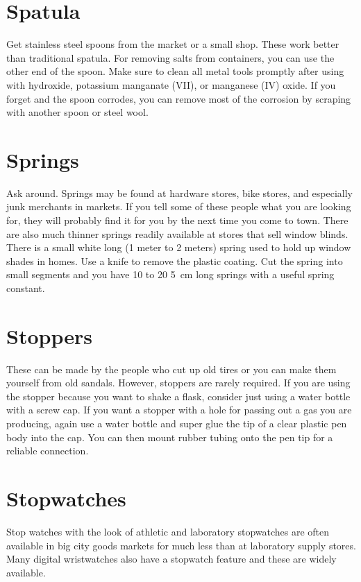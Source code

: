 \section{Spatula}
\label{sec:spatula}
Get stainless steel spoons from the market or a small shop. 
These work better than traditional spatula. 
For removing salts from containers, 
you can use the other end of the spoon. 
Make sure to clean all metal tools promptly after using with hydroxide, 
potassium manganate (VII), 
or manganese (IV) oxide. 
If you forget and the spoon corrodes, 
you can remove most of the corrosion 
by scraping with another spoon or steel wool.

\section{Springs}
\label{sec:springs}
Ask around. 
Springs may be found at hardware stores, 
bike stores, 
and especially junk merchants in markets. 
If you tell some of these people what you are looking for, 
they will probably find it for you by the next time you come to town. 
There are also much thinner springs 
readily available at stores that sell window blinds. 
There is a small white long (1 meter to 2 meters) spring 
used to hold up window shades in homes. 
Use a knife to remove the plastic coating. 
Cut the spring into small segments 
and you have 10 to 20 5~cm long springs with a useful spring constant. 

\section{Stoppers}
\label{sec:stoppers}
These can be made by the people who cut up old tires 
or you can make them yourself from old sandals. 
However, 
stoppers are rarely required. 
If you are using the stopper because you want to shake a flask, 
consider just using a water bottle with a screw cap. 
If you want a stopper with a hole for passing out a gas you are producing, 
again use a water bottle 
and super glue the tip of a clear plastic pen body into the cap. 
You can then mount rubber tubing onto the pen tip 
for a reliable connection.

\section{Stopwatches}
\label{sec:stopwatches}
Stop watches with the look of athletic and laboratory stopwatches 
are often available in big city goods markets 
for much less than at laboratory supply stores. 
Many digital wristwatches also have a stopwatch feature 
and these are widely available.

